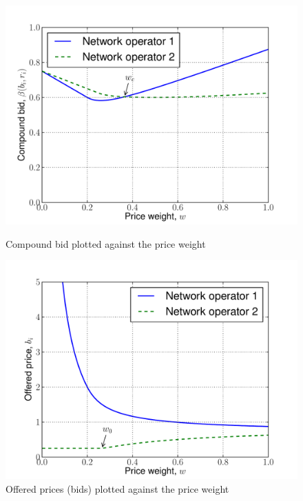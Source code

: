 \begin{figure}[p!]
  \includegraphics[width=\figsize]{Indirect/Figures/indirect_bids}
  \caption{Compound bid plotted against the price weight}
  \label{fig:indirect_bids_indirect}
  \vspace{10mm}
  \includegraphics[width=\figsize]{Indirect/Figures/indirect_prices}
  \caption{Offered prices (bids) plotted against the price weight}
  \label{fig:indirect_prices_indirect}
\end{figure}

